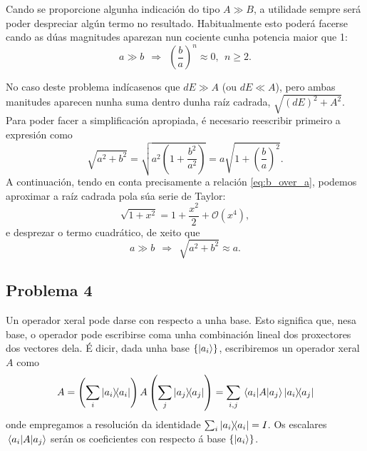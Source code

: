 \documentclass[a4paper,12pt]{article}
\begin{document}
Cando se proporcione algunha indicación do tipo $A \gg B$, a utilidade sempre será poder despreciar algún termo no resultado. Habitualmente esto poderá facerse cando as dúas magnitudes aparezan nun cociente cunha potencia maior que 1:
\begin{equation}
	a \gg b ~~\Longrightarrow~~ \left(\frac{b}{a}\right)^n \approx 0, ~~ n \geq 2.
	\label{eq:b_over_a}
\end{equation}

No caso deste problema indícasenos que $d E \gg A$ (ou $d E \ll A$), pero ambas manitudes aparecen nunha suma dentro dunha raíz cadrada, $\sqrt{(d E)^2 + A^2}$. Para poder facer a simplificación apropiada, é necesario reescribir primeiro a expresión como
\begin{equation}
	\sqrt{a^2 + b^2} = \sqrt{a^2 \left( 1 + \frac{b^2}{a^2} \right)} = a \sqrt{1 + \left(\frac{b}{a}\right)^2}.
\end{equation}
\noindent
A continuación, tendo en conta precisamente a relación \eqref{eq:b_over_a}, podemos aproximar a raíz cadrada pola súa serie de Taylor:
\begin{equation}
	\sqrt{1+x^2} = 1  + \frac{x^2}{2} + \mathcal{O}(x^4),
\end{equation}
\noindent
e desprezar o termo cuadrático, de xeito que
\begin{equation}
	a \gg b ~~\Longrightarrow~~ \sqrt{a^2 + b^2} \approx a.
\end{equation}

\subsection*{Problema 4}

Un operador xeral pode darse con respecto a unha base. Esto significa que, nesa base, o operador pode escribirse coma unha combinación lineal dos proxectores dos vectores dela. É dicir, dada unha base $\{\ket{a_i}\}$, escribiremos un operador xeral $A$ como
\begin{equation}
	A = \left( \sum_i \ketbra{a_i} \right) A \left( \sum_j \ketbra{a_j} \right) = \sum_{i,j} \mel{a_i}{A}{a_j} \ketbra{a_i}{a_j}
	\label{eq:A_a}
\end{equation}
\noindent
onde empregamos a resolución da identidade $\sum_i \ketbra{a_i} = I$. Os escalares $\mel{a_i}{A}{a_j}$ serán os coeficientes con respecto á base $\{\ket{a_i}\}$.
\end{document}
